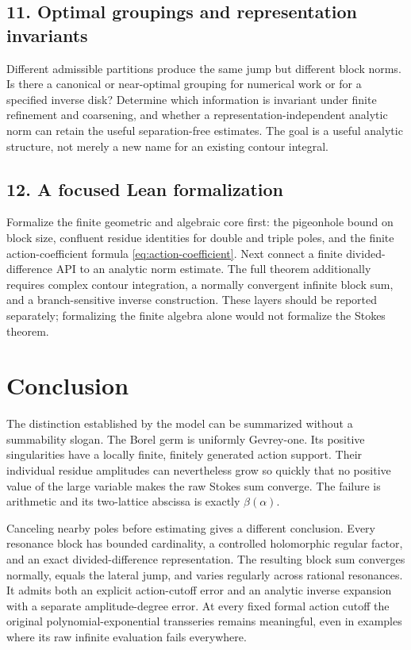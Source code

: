 \documentclass[11pt,a4paper]{article}
\numberwithin{equation}{section}
\theoremstyle{definition}
\theoremstyle{remark}
\begin{document}
\subsection*{11. Optimal groupings and representation invariants}
Different admissible partitions produce the same jump but different
block norms. Is there a canonical or near-optimal grouping for numerical
work or for a specified inverse disk? Determine which information is
invariant under finite refinement and coarsening, and whether a
representation-independent analytic norm can retain the useful
separation-free estimates. The goal is a useful analytic structure, not
merely a new name for an existing contour integral.

\subsection*{12. A focused Lean formalization}
Formalize the finite geometric and algebraic core first: the pigeonhole
bound on block size, confluent residue identities for double and triple
poles, and the finite action-coefficient formula
\eqref{eq:action-coefficient}. Next connect a finite divided-difference
API to an analytic norm estimate. The full theorem additionally requires
complex contour integration, a normally convergent infinite block sum,
and a branch-sensitive inverse construction. These layers should be
reported separately; formalizing the finite algebra alone would not
formalize the Stokes theorem.

\section{Conclusion}
The distinction established by the model can be summarized without a
summability slogan. The Borel germ is uniformly Gevrey-one. Its positive
singularities have a locally finite, finitely generated action support.
Their individual residue amplitudes can nevertheless grow so quickly
that no positive value of the large variable makes the raw Stokes sum
converge. The failure is arithmetic and its two-lattice abscissa is exactly
$\beta(\alpha)$.

Canceling nearby poles before estimating gives a different conclusion.
Every resonance block has bounded cardinality, a controlled holomorphic
regular factor, and an exact divided-difference representation. The
resulting block sum converges normally, equals the lateral jump, and
varies regularly across rational resonances. It admits both an explicit
action-cutoff error and an analytic inverse expansion with a separate
amplitude-degree error. At every fixed formal action cutoff the original
polynomial-exponential transseries remains meaningful, even in examples
where its raw infinite evaluation fails everywhere.
\end{document}
